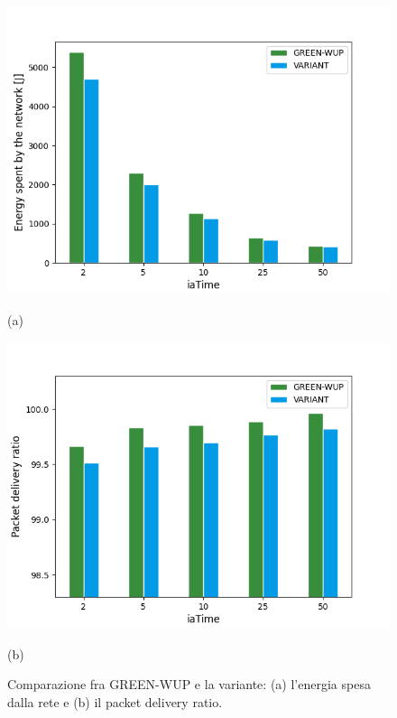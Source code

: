 \documentclass[binding=0.6cm,TFA]{sapthesis}
\begin{document}
\begin{figure}[h]
    \centering
    \begin{minipage}{.5\textwidth}
        \centering
        \includegraphics[width=1\linewidth]{energy_plot.png}
        \caption*{(a)}
    \end{minipage}%
    \begin{minipage}{.5\textwidth}
        \centering
        \includegraphics[width=1\linewidth]{pdr_plot.png}
        \caption*{(b)}
    \end{minipage}
    \caption{Comparazione fra GREEN-WUP e la variante: (a) l'energia spesa dalla rete e (b) il packet delivery ratio.}
\end{figure}
\end{document}

